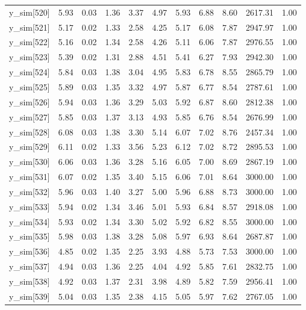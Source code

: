 \begin{table}[ht]
\begin{tabular}{rrrrrrrrrrr}
  y\_sim[520] & 5.93 & 0.03 & 1.36 & 3.37 & 4.97 & 5.93 & 6.88 & 8.60 & 2617.31 & 1.00 \\ 
  y\_sim[521] & 5.17 & 0.02 & 1.33 & 2.58 & 4.25 & 5.17 & 6.08 & 7.87 & 2947.97 & 1.00 \\ 
  y\_sim[522] & 5.16 & 0.02 & 1.34 & 2.58 & 4.26 & 5.11 & 6.06 & 7.87 & 2976.55 & 1.00 \\ 
  y\_sim[523] & 5.39 & 0.02 & 1.31 & 2.88 & 4.51 & 5.41 & 6.27 & 7.93 & 2942.30 & 1.00 \\ 
  y\_sim[524] & 5.84 & 0.03 & 1.38 & 3.04 & 4.95 & 5.83 & 6.78 & 8.55 & 2865.79 & 1.00 \\ 
  y\_sim[525] & 5.89 & 0.03 & 1.35 & 3.32 & 4.97 & 5.87 & 6.77 & 8.54 & 2787.61 & 1.00 \\ 
  y\_sim[526] & 5.94 & 0.03 & 1.36 & 3.29 & 5.03 & 5.92 & 6.87 & 8.60 & 2812.38 & 1.00 \\ 
  y\_sim[527] & 5.85 & 0.03 & 1.37 & 3.13 & 4.93 & 5.85 & 6.76 & 8.54 & 2676.99 & 1.00 \\ 
  y\_sim[528] & 6.08 & 0.03 & 1.38 & 3.30 & 5.14 & 6.07 & 7.02 & 8.76 & 2457.34 & 1.00 \\ 
  y\_sim[529] & 6.11 & 0.02 & 1.33 & 3.56 & 5.23 & 6.12 & 7.02 & 8.72 & 2895.53 & 1.00 \\ 
  y\_sim[530] & 6.06 & 0.03 & 1.36 & 3.28 & 5.16 & 6.05 & 7.00 & 8.69 & 2867.19 & 1.00 \\ 
  y\_sim[531] & 6.07 & 0.02 & 1.35 & 3.40 & 5.15 & 6.06 & 7.01 & 8.64 & 3000.00 & 1.00 \\ 
  y\_sim[532] & 5.96 & 0.03 & 1.40 & 3.27 & 5.00 & 5.96 & 6.88 & 8.73 & 3000.00 & 1.00 \\ 
  y\_sim[533] & 5.94 & 0.02 & 1.34 & 3.46 & 5.01 & 5.93 & 6.84 & 8.57 & 2918.08 & 1.00 \\ 
  y\_sim[534] & 5.93 & 0.02 & 1.34 & 3.30 & 5.02 & 5.92 & 6.82 & 8.55 & 3000.00 & 1.00 \\ 
  y\_sim[535] & 5.98 & 0.03 & 1.38 & 3.28 & 5.08 & 5.97 & 6.93 & 8.64 & 2687.87 & 1.00 \\ 
  y\_sim[536] & 4.85 & 0.02 & 1.35 & 2.25 & 3.93 & 4.88 & 5.73 & 7.53 & 3000.00 & 1.00 \\ 
  y\_sim[537] & 4.94 & 0.03 & 1.36 & 2.25 & 4.04 & 4.92 & 5.85 & 7.61 & 2832.75 & 1.00 \\ 
  y\_sim[538] & 4.92 & 0.03 & 1.37 & 2.31 & 3.98 & 4.89 & 5.82 & 7.59 & 2956.41 & 1.00 \\ 
  y\_sim[539] & 5.04 & 0.03 & 1.35 & 2.38 & 4.15 & 5.05 & 5.97 & 7.62 & 2767.05 & 1.00 \\ 

\end{tabular}
\end{table}
